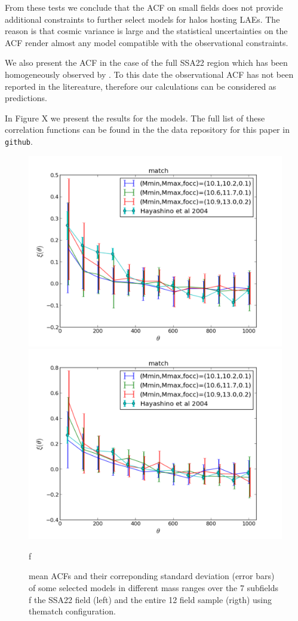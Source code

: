 \documentclass[usenatbib]{mn2e}
\begin{document}
From these tests we conclude that the ACF on small fields does not
provide additional constraints to further select models for halos
hosting LAEs. The reason is that cosmic variance is large and the
statistical uncertainties on the ACF render almost any model
compatible with the observational constraints. 

We also present the ACF in the case of the full SSA22
region which has been homogeneously observed by \citep{Yamada2012}. To
this date the observational ACF has not been reported in the
litereature, therefore our calculations can be considered as
predictions. 

In Figure X we present the results for the models. The full list of
these correlation functions can be found in the the data repository
for this paper in \verb"github". 



\begin{figure}
\begin{center}
\includegraphics[width=0.46\linewidth,angle=0]{./plots/match_large_correlation_selected_models.pdf}
\hspace{5mm}
\includegraphics[width=0.46\linewidth,angle=0]{./plots/match_full_correlation_selected_models.pdf}
\end{center} f
\caption{ mean ACFs   and their correponding standard deviation (error
  bars)  of some selected models in different mass ranges over the 7
  subfields  f the SSA22 field (left) and the entire 12 field sample
  (rigth) using thematch
  configuration. \label{figure:correlation_match} }  
  
\end{figure}
\end{document}

